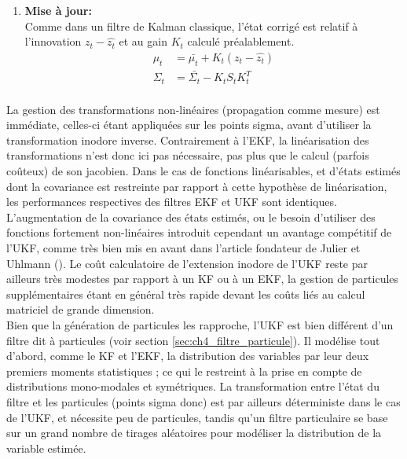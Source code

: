 \begin{enumerate}
	\item{\textbf{Mise à jour:}}\\
	Comme dans un filtre de Kalman classique, l'état corrigé est relatif à l'innovation $z_t - \hat{z_t}$ et au gain $K_t$ calculé préalablement.
	\begin{align}
		\mu_t &= \bar{\mu_t} + K_t(z_t - \hat{z_t}) 	\label{eq:UKF_prop2}\\
		\Sigma_t &= \bar{\Sigma_t} - K_t S_t K_t^T		\label{eq:UKF_prop3}\\ \nonumber
	\end{align}
\end{enumerate}

La gestion des transformations non-linéaires (propagation comme mesure) est immédiate, celles-ci étant appliquées sur les points sigma, avant d'utiliser la transformation inodore inverse. Contrairement à l'EKF, la linéarisation des transformations n'est donc ici pas nécessaire, pas plus que le calcul (parfois coûteux) de son jacobien. Dans le cas de fonctions linéarisables, et d'états estimés dont la covariance est restreinte par rapport à cette hypothèse de linéarisation, les performances respectives des filtres EKF et UKF sont identiques. L'augmentation de la covariance des états estimés, ou le besoin d'utiliser des fonctions fortement non-linéaires introduit cependant un avantage compétitif de l'UKF, comme très bien mis en avant dans l'article fondateur de Julier et Uhlmann (\cite{Julier1997}). Le coût calculatoire de l'extension inodore de l'UKF reste par ailleurs très modestes par rapport à un KF ou à un EKF, la gestion de particules supplémentaires étant en général très rapide devant les coûts liés au calcul matriciel de grande dimension.\\

Bien que la génération de particules les rapproche, l'UKF est bien différent d'un filtre dit \og à particules\fg{} (voir section \ref{sec:ch4_filtre_particule}). Il modélise tout d'abord, comme le KF et l'EKF, la distribution des variables par leur deux premiers moments statistiques ; ce qui le restreint à la prise en compte de distributions mono-modales et symétriques. La transformation entre l'état du filtre et les particules (\og points sigma\fg{} donc) est par ailleurs déterministe dans le cas de l'UKF, et nécessite peu de particules, tandis qu'un filtre particulaire se base sur un grand nombre de tirages aléatoires pour modéliser la distribution de la variable estimée.

